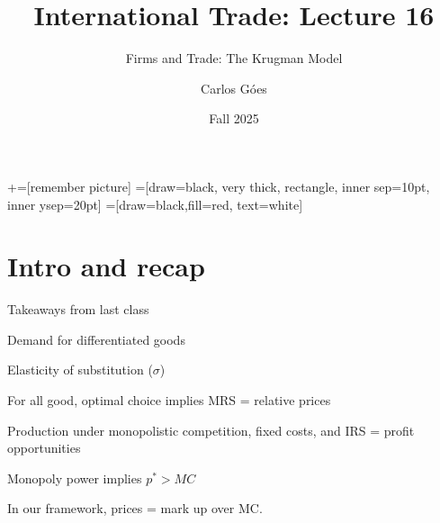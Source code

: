 \documentclass[notes,11pt, aspectratio=169, xcolor=table]{beamer}
\title[]{International Trade: Lecture 16}
\subtitle[]{Firms and Trade: The Krugman Model}
\author[Góes]
{Carlos Góes\inst{1}}
\date{Fall 2025}
\institute[GWU]{\inst{1} George Washington University }
\newenvironment{wideitemize}{\itemize\addtolength{\itemsep}{10pt}}{\enditemize}
\begin{document}
\newcommand\marktopleft[1]{%
    \tikz[overlay,remember picture] 
        \node (marker-#1-a) at (-.3em,.3em) {};%
}
\newcommand\markbottomright[2]{%
    \tikz[overlay,remember picture] 
        \node (marker-#1-b) at (0em,0em) {};%
}
+=[remember picture] 
 =[draw=black, very thick, rectangle, inner sep=10pt, inner ysep=20pt]
 =[draw=black,fill=red, text=white]















\frame{\titlepage}
\addtocounter{framenumber}{-1}

\section{Intro and recap}

\begin{frame}{Takeaways from last class}
\begin{wideitemize}
    \item Demand for differentiated goods
    \item Elasticity of substitution ($\sigma$)
    \item For all good, optimal choice implies MRS = relative prices
    \item Production under monopolistic competition, fixed costs, and IRS = profit opportunities
    \item Monopoly power implies $p^* > MC$
    \item In our framework, prices = mark up over MC.
    \end{wideitemize}
 \end{frame}
\end{document}
